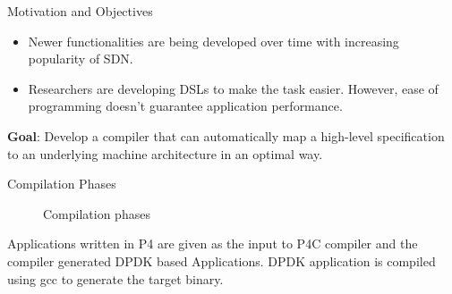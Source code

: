 \documentclass[final]{beamer}
\newlength{\onecolwid}
\begin{document}
\begin{frame}
\begin{columns}[t]
\begin{column}{\onecolwid}
\begin{exampleblock}{Motivation and Objectives}
\begin{itemize}
 \item Newer functionalities are being developed over time with increasing popularity of SDN.
 \item Researchers are developing DSLs to make the task easier. However, ease of programming doesn't guarantee application performance.
\end{itemize}
\vspace{1cm}
\textbf{Goal}: Develop a compiler that can automatically map a high-level specification to an underlying machine architecture in an optimal way.
\end{exampleblock}


\begin{exampleblock}{Compilation Phases}


\begin{figure}
\caption{Compilation phases}
\end{figure}
Applications written in P4\cite{p4} are given as the input to P4C\cite{p4c} compiler and the compiler generated DPDK\cite{DPDK} based Applications. DPDK\cite{DPDK} application is compiled using gcc to generate the target binary.
\end{exampleblock}



\end{column}
\end{columns}
\end{frame}
\end{document}
